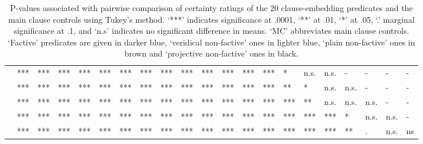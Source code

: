 \documentclass[11pt,fleqn]{article}
\newcommand{\6}{\mbox{$[\hspace*{-.6mm}[$}}
\newcommand{\9}{\mbox{$]\hspace*{-.6mm}]$}}
\begin{document}
\begin{table}[h!]
\begin{tabular}{l l l l l l l l l l l l l l l l l l l l l }
\color{blue}{\em discover}\color{black}	& ***		& *** & *** & *** & *** & *** & *** & *** & *** & *** &  ***  &  ***  &  ***  & * & n.s. & n.s. & - & - & - & - \\
\color{black}{\em inform}\color{black}		&***		& *** & *** & *** & *** & *** & *** & *** & *** & *** & *** & *** &  ***  & ** & * & n.s. & n.s. & - & - & - \\
\color{blue}{\em see}\color{black}		&***		& *** & *** & *** & *** & *** & *** & *** & *** & *** & *** &  ***  &  ***  &  ***  & ** & n.s. & n.s. & n.s. & - & - \\
\color{blue}{\em know}\color{black}		&***		& *** & *** & *** & *** & *** & *** & *** & *** & *** & *** & *** & *** & *** & *** & *** & * & n.s. & n.s. & -  \\
\color{blue}{\em be annoyed}\color{black}	&***		& *** & *** & *** & *** & *** & *** & *** & *** & ***  & ***  & *** & *** & *** & *** & *** & ** & . & n.s. & ns  \\

\bottomrule
\end{tabular}
\caption{P-values associated with pairwise comparison of certainty ratings of the 20 clause-embedding predicates and the main clause controls using Tukey's method. `***' indicates significance at .0001, `**' at .01, `*' at .05, `.' marginal significance at .1, and `n.s' indicates no significant difference in means. `MC' abbreviates main clause controls. `Factive' predicates are given in darker blue, `veridical non-factive' ones in lighter blue, `plain non-factive' ones in brown and `projective non-factive' ones in black.}\label{t-pairwise-proj}
\end{table} 
\end{document}
